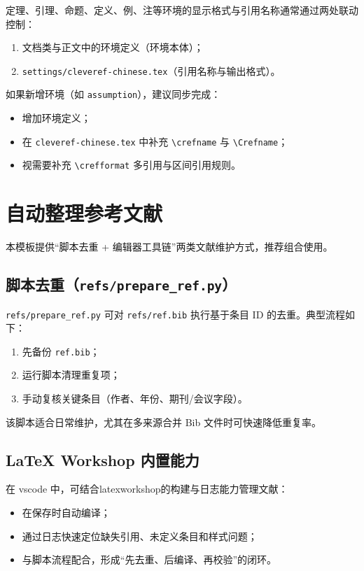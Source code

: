 定理、引理、命题、定义、例、注等环境的显示格式与引用名称通常通过两处联动控制：
\begin{enumerate}
  \item 文档类与正文中的环境定义（环境本体）；
  \item \texttt{settings/cleveref-chinese.tex}（引用名称与输出格式）。
\end{enumerate}

如果新增环境（如 \texttt{assumption}），建议同步完成：
\begin{itemize}
  \item 增加环境定义；
  \item 在 \texttt{cleveref-chinese.tex} 中补充 \texttt{\textbackslash crefname} 与 \texttt{\textbackslash Crefname}；
  \item 视需要补充 \texttt{\textbackslash crefformat} 多引用与区间引用规则。
\end{itemize}

\section{自动整理参考文献}

本模板提供“脚本去重 + 编辑器工具链”两类文献维护方式，推荐组合使用。

\subsection{脚本去重（\texttt{refs/prepare\_ref.py}）}

\texttt{refs/prepare\_ref.py} 可对 \texttt{refs/ref.bib} 执行基于条目 ID 的去重。典型流程如下：
\begin{enumerate}
  \item 先备份 \texttt{ref.bib}；
  \item 运行脚本清理重复项；
  \item 手动复核关键条目（作者、年份、期刊/会议字段）。
\end{enumerate}

该脚本适合日常维护，尤其在多来源合并 Bib 文件时可快速降低重复率。

\subsection{LaTeX Workshop 内置能力}

在 \gls{vscode} 中，可结合\gls{latexworkshop}的构建与日志能力管理文献：
\begin{itemize}
  \item 在保存时自动编译；
  \item 通过日志快速定位缺失引用、未定义条目和样式问题；
  \item 与脚本流程配合，形成“先去重、后编译、再校验”的闭环。
\end{itemize}

